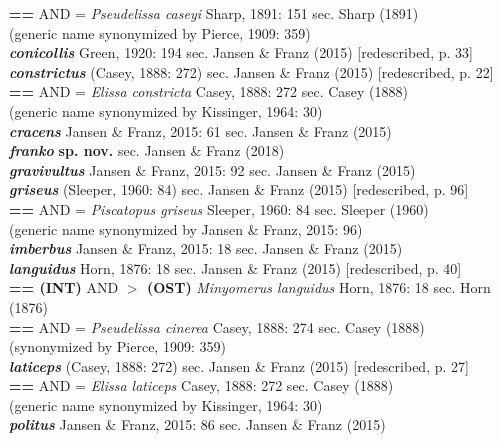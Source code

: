 \documentclass[fleqn,10pt,lineno]{wlpeerj} %
\begin{document}
\begin{tabbing}
				\> \> \textbf{==} AND = \textit{Pseudelissa caseyi} Sharp, 1891: 151 sec. Sharp (1891)\\
				\> \> \> (generic name synonymized by Pierce, 1909: 359)\\
			\> \textbf{\textit{conicollis}} Green, 1920: 194 sec. Jansen \& Franz (2015) [redescribed, p. 33]\\
			\> \textbf{\textit{constrictus}} (Casey, 1888: 272) sec. Jansen \& Franz (2015) [redescribed, p. 22]\\
				\> \> \textbf{==} AND = \textit{Elissa constricta} Casey, 1888: 272 sec. Casey (1888)\\
				\> \> \> (generic name synonymized by Kissinger, 1964: 30)\\
			\> \textbf{\textit{cracens}} Jansen \& Franz, 2015: 61 sec. Jansen \& Franz (2015)\\
			\> \textbf{\textit{franko}} \textbf{sp. nov.} sec. Jansen \& Franz (2018)\\
			\> \textbf{\textit{gravivultus}} Jansen \& Franz, 2015: 92 sec. Jansen \& Franz (2015)\\
			\> \textbf{\textit{griseus}} (Sleeper, 1960: 84) sec. Jansen \& Franz (2015) [redescribed, p. 96]\\
				\> \> \textbf{==} AND = \textit{Piscatopus griseus} Sleeper, 1960: 84 sec. Sleeper (1960)\\
				\> \> \> (generic name synonymized by Jansen \& Franz, 2015: 96)\\
			\> \textbf{\textit{imberbus}} Jansen \& Franz, 2015: 18 sec. Jansen \& Franz (2015)\\
			\> \textbf{\textit{languidus}} Horn, 1876: 18 sec. Jansen \& Franz (2015) [redescribed, p. 40]\\
				\> \> \textbf{== (INT)} AND \textbf{$>$ (OST)} \textit{Minyomerus languidus} Horn, 1876: 18 sec. Horn (1876)\\
				\> \> \textbf{==} AND = \textit{Pseudelissa cinerea} Casey, 1888: 274 sec. Casey (1888)\\
				\> \> \> (synonymized by Pierce, 1909: 359)\\
			\> \textbf{\textit{laticeps}} (Casey, 1888: 272) sec. Jansen \& Franz (2015) [redescribed, p. 27]\\
				\> \> \textbf{==} AND = \textit{Elissa laticeps} Casey, 1888: 272 sec. Casey (1888)\\
				\> \> \> (generic name synonymized by Kissinger, 1964: 30)\\
			\> \textbf{\textit{politus}} Jansen \& Franz, 2015: 86 sec. Jansen \& Franz (2015)\\

\end{tabbing}
\end{document}
